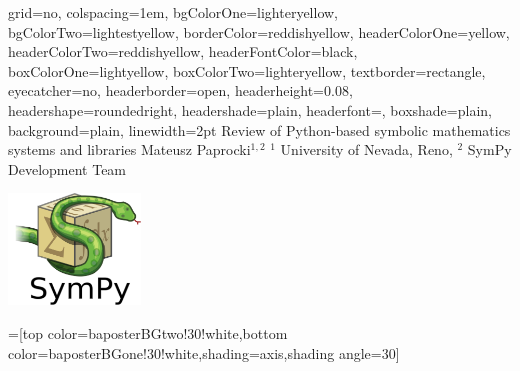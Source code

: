 \documentclass[portrait]{baposter}
\begin{document}
\begin{poster}{
  grid=no,
  colspacing=1em,
  bgColorOne=lighteryellow,
  bgColorTwo=lightestyellow,
  borderColor=reddishyellow,
  headerColorOne=yellow,
  headerColorTwo=reddishyellow,
  headerFontColor=black,
  boxColorOne=lightyellow,
  boxColorTwo=lighteryellow,
  textborder=rectangle,
  eyecatcher=no,
  headerborder=open,
  headerheight=0.08\textheight,
  headershape=roundedright,
  headershade=plain,
  headerfont=\Large\textsf, %
  boxshade=plain,
  background=plain,
  linewidth=2pt
  }
  {} %
  {\sf %
  Review of Python-based symbolic mathematics systems and libraries}
  {\sf %
  Mateusz Paprocki$^{1,2}$
  \hspace{3em}
  $^1$ University of Nevada, Reno,
  $^2$ SymPy Development Team
  }
  {{\begin{minipage}{12em}
    \hfill
    \includegraphics[height=8.0em]{sympy-logo}
  \end{minipage}}
  }

  =[top color=baposterBGtwo!30!white,bottom color=baposterBGone!30!white,shading=axis,shading angle=30]

     \newlength{\leftimgwidth}
     \setlength{\leftimgwidth}{0.78em+8.0em}



\end{poster}
\end{document}
